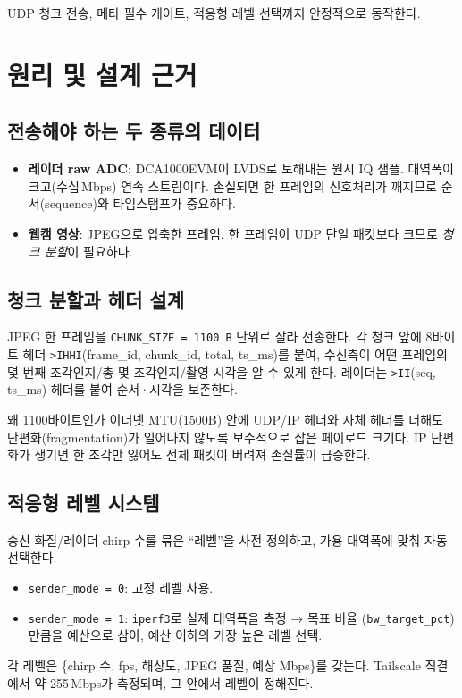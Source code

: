 \begin{statusdone}
UDP 청크 전송, 메타 필수 게이트, 적응형 레벨 선택까지 안정적으로 동작한다.
\end{statusdone}

\chapter{원리 및 설계 근거}

\section{전송해야 하는 두 종류의 데이터}
\begin{itemize}
  \item \textbf{레이더 raw ADC}: DCA1000EVM이 LVDS로 토해내는 원시 IQ 샘플.
        대역폭이 크고(수십\,Mbps) 연속 스트림이다. 손실되면 한 프레임의 신호처리가
        깨지므로 순서(sequence)와 타임스탬프가 중요하다.
  \item \textbf{웹캠 영상}: JPEG으로 압축한 프레임. 한 프레임이 UDP 단일 패킷보다
        크므로 \emph{청크 분할}이 필요하다.
\end{itemize}

\section{청크 분할과 헤더 설계}
JPEG 한 프레임을 \texttt{CHUNK\_SIZE = 1100\,B} 단위로 잘라 전송한다. 각 청크
앞에 8바이트 헤더 \texttt{>IHHI}(frame\_id, chunk\_id, total, ts\_ms)를 붙여,
수신측이 어떤 프레임의 몇 번째 조각인지/총 몇 조각인지/촬영 시각을 알 수 있게 한다.
레이더는 \texttt{>II}(seq, ts\_ms) 헤더를 붙여 순서·시각을 보존한다.

\begin{designbox}{왜 1100바이트인가}
이더넷 MTU(1500B) 안에 UDP/IP 헤더와 자체 헤더를 더해도 단편화(fragmentation)가
일어나지 않도록 보수적으로 잡은 페이로드 크기다. IP 단편화가 생기면 한 조각만
잃어도 전체 패킷이 버려져 손실률이 급증한다.
\end{designbox}

\section{적응형 레벨 시스템}
송신 화질/레이더 chirp 수를 묶은 ``레벨''을 사전 정의하고, 가용 대역폭에 맞춰
자동 선택한다.
\begin{itemize}
  \item \texttt{sender\_mode = 0}: 고정 레벨 사용.
  \item \texttt{sender\_mode = 1}: \texttt{iperf3}로 실제 대역폭을 측정 → 목표 비율
        (\texttt{bw\_target\_pct})만큼을 예산으로 삼아, 예산 이하의 가장 높은 레벨 선택.
\end{itemize}
각 레벨은 \{chirp 수, fps, 해상도, JPEG 품질, 예상 Mbps\}를 갖는다. Tailscale
직결에서 약 255\,Mbps가 측정되며, 그 안에서 레벨이 정해진다.

